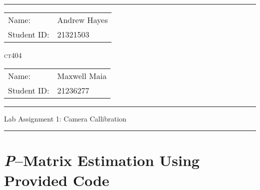 \documentclass[a4paper]{article}
\begin{document}
\hrule \medskip
\begin{minipage}{0.295\textwidth} 
    \raggedright
    \footnotesize 
    \begin{tabular}{@{}l l} %
        Name: & Andrew Hayes \\
        Student ID: & 21321503 \\
    \end{tabular}
\end{minipage}
\begin{minipage}{0.4\textwidth} 
    \centering 
    \vspace{0.4em}
    \LARGE 
    \textsc{ct404} \\ 
\end{minipage}
\begin{minipage}{0.295\textwidth} 
    \raggedleft
    \footnotesize 
    \begin{tabular}{@{}l l} %
        Name: & Maxwell Maia \\
        Student ID: & 21236277 \\
    \end{tabular}
\end{minipage}
\smallskip
\hrule 
\begin{center}
    \normalsize
    Lab Assignment 1: Camera Callibration
\end{center}
\hrule

\section{\textit{P}–Matrix Estimation Using Provided Code}
\end{document}
